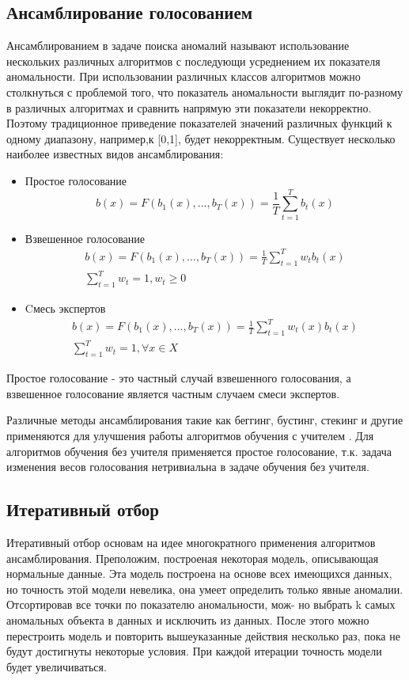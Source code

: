 \subsection{Ансамблирование голосованием}
Ансамблированием в задаче поиска аномалий называют использование нескольких различных алгоритмов с последующи усреднением их показателя аномальности. При использовании различных классов алгоритмов можно столкнуться с проблемой того, что показатель аномальности выглядит по-разному в различных алгоритмах и сравнить напрямую эти показатели некорректно.  Поэтому традиционное приведение  показателей значений различных функций к одному диапазону, например,к [0,1], будет некорректным.
Существует несколько наиболее известных видов ансамблирования:
\begin{itemize}
	\item Простое голосование 
	\begin{equation}
	b(x)=F(b_1(x),...,b_T(x))=\frac{1}{T}\sum_{t=1}^{T}b_t(x)
	\end{equation}
	\item Взвешенное голосование 
	\begin{gather}
	b(x)=F(b_1(x),...,b_T(x))=\frac{1}{T}\sum_{t=1}^{T}w_tb_t(x)\\
		\sum_{t=1}^{T}w_t=1, w_t \geq 0
	\end{gather}
		\item Cмесь экспертов
		\begin{gather}
		b(x)=F(b_1(x),...,b_T(x))=\frac{1}{T}\sum_{t=1}^{T}w_t(x)b_t(x)\\
		\sum_{t=1}^{T}w_t=1, \forall x\in X
		\end{gather}
 \end{itemize}
	Простое голосование - это  частный случай взвешенного голосования, а взвешенное голосование является частным случаем смеси экспертов. 
	
	Различные методы ансамблирования такие как беггинг, бустинг, стекинг и другие применяются для улучшения работы алгоритмов обучения с учителем . Для алгоритмов обучения без учителя применяется простое голосование, т.к. задача изменения весов голосования нетривиальна в задаче обучения без учителя\cite{Book16}.
\subsection{Итеративный отбор}
Итеративный отбор основам на идее многократного применения алгоритмов ансамблирования. Преположим, построеная некоторая модель, описывающая нормальные данные. Эта модель построена на основе всех  имеющихся данных, но точность этой модели невелика, она умеет определить только явные аномалии. Отсортировав все точки по показателю аномальности, мож-
но выбрать k самых аномальных объекта в данных и исключить из данных. После этого можно перестроить модель и повторить вышеуказанные действия несколько раз, пока не будут достигнуты некоторые условия. При каждой итерации точность модели будет увеличиваться.

